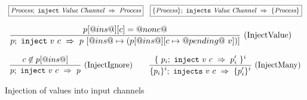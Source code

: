 
\begin{figure}

$$
\begin{array}{lr} 
  \boxed{\textit{Process};~\texttt{inject}~\textit{Value}~\textit{Channel}~\Rightarrow~\textit{Process}}
 & 
  \boxed{\{ \textit{Process} \};~\texttt{injects}~\textit{Value}~\textit{Channel}~\Rightarrow~\{ \textit{Process} \}}
 \end{array}
$$

$$
\enskip \frac {\displaystyle 
  p[@ins@][c] = @none@
} {\displaystyle 
  p;~\texttt{inject}~v~c~\Rightarrow~p~[@ins@ \mapsto (p[@ins@][c \mapsto @pending@~v]) ] 
} \  \mbox{(InjectValue)} \enskip
$$

$$
\ruleIN{
  c \not\in p[@ins@]
}{
  \ProcInject{p}{v}{c}{p}
}{InjectIgnore}
%
\quad
%
\ruleIN{
  \{~ \ProcInject{p_i}{v}{c}{p'_i} ~\}^i
}{
  \ProcsInject{\sgl{p_i}^i}{v}{c}{\sgl{p'_i}^i}
}{InjectMany}
$$

\caption{Injection of values into input channels}
\label{fig:Process:Eval:Inject}
\end{figure}


